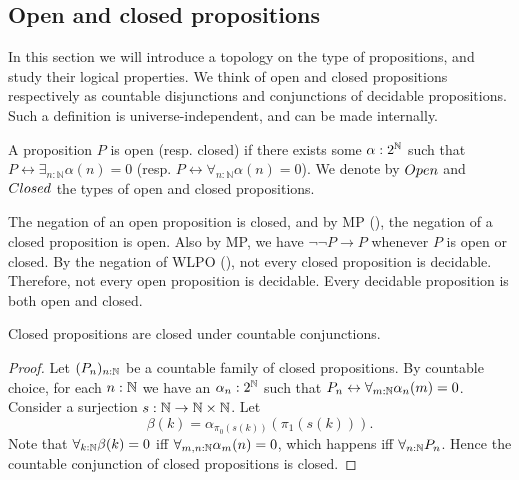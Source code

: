 %
\subsection{Open and closed propositions}
In this section we will introduce a topology on the type of propositions, and 
study their logical properties.
We think of open and closed propositions respectively as countable disjunctions and conjunctions of decidable propositions.
Such a definition is universe-independent, and can be made internally.

\begin{definition}
A proposition $P$ is open (resp. closed) if there exists some $\alpha:2^{\mathbb{N}}$ such that $P \leftrightarrow \exists_{n:\mathbb N} \alpha(n) = 0$ (resp. $P \leftrightarrow \forall_{n:\mathbb N} \alpha(n) = 0$). We denote by $\Open$ and $\Closed$ the types of open and closed propositions.
\end{definition}

\begin{remark}\label{rmkOpenClosedNegation}
  The negation of an open proposition is closed, 
  and by MP (), the negation of a closed proposition is open. 
  Also by MP, we have $\neg \neg P \to P$ whenever $P$ is open or closed. 
  By the negation of WLPO (), 
  not every closed proposition is decidable. 
  Therefore, not every open proposition is decidable. 
  Every decidable proposition is both open and closed.
\end{remark}

\begin{lemma}\label{ClosedCountableConjunction}
  Closed propositions are closed under countable conjunctions.
\end{lemma}
\begin{proof}
  Let $(P_n)_{n:\mathbb{N}}$ be a countable family of closed propositions. 
  By countable choice, for each 
  $n:\mathbb{N}$ we have an $\alpha_n:2^{\mathbb{N}} $ 
  such that $P_n \leftrightarrow \forall_{m:\mathbb{N}} \alpha_n(m)  =0$. 
  Consider a surjection $s:\mathbb{N} \to \mathbb{N} \times \mathbb{N}$.
  Let 
  $$\beta(k) = \alpha_{\pi_0(s(k))}(\pi_1 (s(k))).$$
  Note that $\forall_{k:\mathbb{N}} \beta(k) = 0$ iff 
  $\forall_{m,n:\mathbb{N}}\alpha_m(n) = 0$, which happens iff $\forall_{n:\mathbb{N}} P_n$. 
  Hence the countable conjunction of closed propositions is closed. 
\end{proof} 

